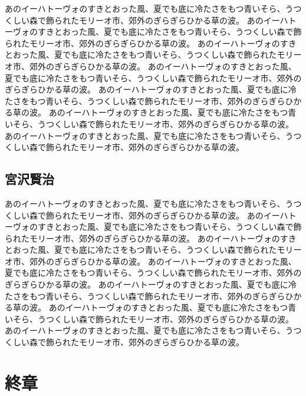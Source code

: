 \documentclass[b5j]{ltjsbook}
\begin{document}
あのイーハトーヴォのすきとおった風、夏でも底に冷たさをもつ青いそら、うつくしい森で飾られたモリーオ市、郊外のぎらぎらひかる草の波。
あのイーハトーヴォのすきとおった風、夏でも底に冷たさをもつ青いそら、うつくしい森で飾られたモリーオ市、郊外のぎらぎらひかる草の波。
あのイーハトーヴォのすきとおった風、夏でも底に冷たさをもつ青いそら、うつくしい森で飾られたモリーオ市、郊外のぎらぎらひかる草の波。
あのイーハトーヴォのすきとおった風、夏でも底に冷たさをもつ青いそら、うつくしい森で飾られたモリーオ市、郊外のぎらぎらひかる草の波。
あのイーハトーヴォのすきとおった風、夏でも底に冷たさをもつ青いそら、うつくしい森で飾られたモリーオ市、郊外のぎらぎらひかる草の波。
あのイーハトーヴォのすきとおった風、夏でも底に冷たさをもつ青いそら、うつくしい森で飾られたモリーオ市、郊外のぎらぎらひかる草の波。
あのイーハトーヴォのすきとおった風、夏でも底に冷たさをもつ青いそら、うつくしい森で飾られたモリーオ市、郊外のぎらぎらひかる草の波。

\section{宮沢賢治}

あのイーハトーヴォのすきとおった風、夏でも底に冷たさをもつ青いそら、うつくしい森で飾られたモリーオ市、郊外のぎらぎらひかる草の波。
あのイーハトーヴォのすきとおった風、夏でも底に冷たさをもつ青いそら、うつくしい森で飾られたモリーオ市、郊外のぎらぎらひかる草の波。
あのイーハトーヴォのすきとおった風、夏でも底に冷たさをもつ青いそら、うつくしい森で飾られたモリーオ市、郊外のぎらぎらひかる草の波。
あのイーハトーヴォのすきとおった風、夏でも底に冷たさをもつ青いそら、うつくしい森で飾られたモリーオ市、郊外のぎらぎらひかる草の波。
あのイーハトーヴォのすきとおった風、夏でも底に冷たさをもつ青いそら、うつくしい森で飾られたモリーオ市、郊外のぎらぎらひかる草の波。
あのイーハトーヴォのすきとおった風、夏でも底に冷たさをもつ青いそら、うつくしい森で飾られたモリーオ市、郊外のぎらぎらひかる草の波。
あのイーハトーヴォのすきとおった風、夏でも底に冷たさをもつ青いそら、うつくしい森で飾られたモリーオ市、郊外のぎらぎらひかる草の波。

\chapter{終章}
\end{document}
